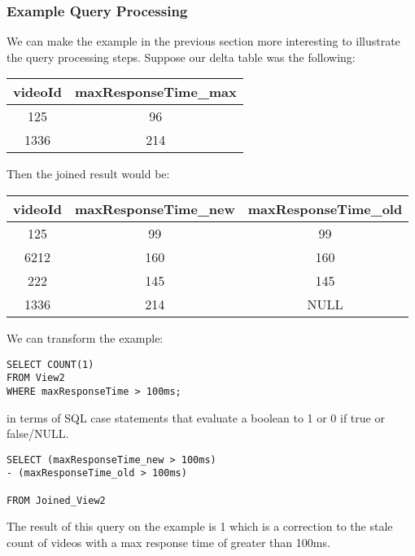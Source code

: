 \subsubsection{Example Query Processing}
We can make the example in the previous section more interesting to illustrate the query processing steps.
Suppose our delta table was the following:

\begin{tabular}{|c|c|}
\hline 
videoId & maxResponseTime\_max\tabularnewline
\hline 
\hline 
125 & 96\tabularnewline
\hline 
1336 & 214\tabularnewline
\hline 
\end{tabular}

Then the joined result would be:

\begin{tabular}{|c|c|c|}
\hline 
videoId & maxResponseTime\_new & maxResponseTime\_old \tabularnewline
\hline 
\hline 
125 & 99 & 99\tabularnewline
\hline 
6212 & 160 & 160\tabularnewline
\hline 
222 & 145 & 145\tabularnewline
\hline 
1336 & 214 & NULL\tabularnewline
\hline 
\end{tabular}

We can transform the example:

\begin{lstlisting}
SELECT COUNT(1) 
FROM View2 
WHERE maxResponseTime > 100ms;
\end{lstlisting}

in terms of SQL case statements that evaluate a boolean to 1 or 0 if true or false/NULL.
\begin{lstlisting}
SELECT (maxResponseTime_new > 100ms) 
- (maxResponseTime_old > 100ms)

FROM Joined_View2 
\end{lstlisting}
The result of this query on the example is 1 which is a correction to the stale count 
of videos with a max response time of greater than 100ms.

\fi
